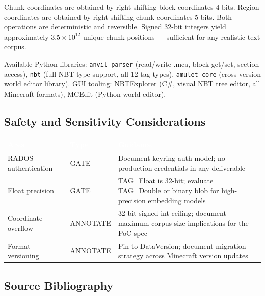 \documentclass[11pt,letterpaper]{article}
\newcommand{\tableheader}[1]{\textbf{\sffamily\textcolor{white}{#1}}}
\begin{document}
Chunk coordinates are obtained by right-shifting block coordinates 4 bits. Region coordinates are obtained by right-shifting chunk coordinates 5 bits. Both operations are deterministic and reversible. Signed 32-bit integers yield approximately $3.5 \times 10^{12}$ unique chunk positions --- sufficient for any realistic text corpus.

Available Python libraries: \texttt{anvil-parser} (read/write .mca, block get/set, section access), \texttt{nbt} (full NBT type support, all 12 tag types), \texttt{amulet-core} (cross-version world editor library). GUI tooling: NBTExplorer (C\#, visual NBT tree editor, all Minecraft formats), MCEdit (Python world editor).

\subsection{Safety and Sensitivity Considerations}

\begin{center}
\begin{tabularx}{\textwidth}{L{3cm}L{2cm}X}
\toprule
{}
\tableheader{Area} & \tableheader{Type} & \tableheader{Guidance} \\
\midrule
RADOS authentication & GATE & Document keyring auth model; no production credentials in any deliverable \\
Float precision & GATE & TAG\_Float is 32-bit; evaluate TAG\_Double or binary blob for high-precision embedding models \\
Coordinate overflow & ANNOTATE & 32-bit signed int ceiling; document maximum corpus size implications for the PoC spec \\
Format versioning & ANNOTATE & Pin to DataVersion; document migration strategy across Minecraft version updates \\
\bottomrule
\end{tabularx}
\end{center}

\subsection{Source Bibliography}
\end{document}
